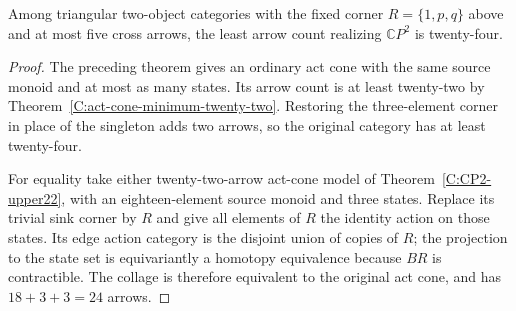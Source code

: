 \begin{corollary}
\label{C:right-zero-five-state-minimum24}
Among triangular two-object categories with the fixed corner
$R=\{1,p,q\}$ above and at most five cross arrows, the least
arrow count realizing $\mathbb CP^2$ is twenty-four.
\end{corollary}
\begin{proof}
The preceding theorem gives an ordinary act cone with the same
source monoid and at most as many states. Its arrow count is at
least twenty-two by Theorem~\ref{C:act-cone-minimum-twenty-two}.
Restoring the three-element corner in place of the singleton adds
two arrows, so the original category has at least twenty-four.

For equality take either twenty-two-arrow act-cone model of
Theorem~\ref{C:CP2-upper22}, with an eighteen-element source
monoid and three states. Replace its trivial sink corner by $R$
and give all elements of $R$ the identity action on those states.
Its edge action category is the disjoint union of copies of $R$;
the projection to the state set is equivariantly a homotopy
equivalence because $BR$ is contractible. The collage is therefore
equivalent to the original act cone, and has $18+3+3=24$ arrows.
\end{proof}
